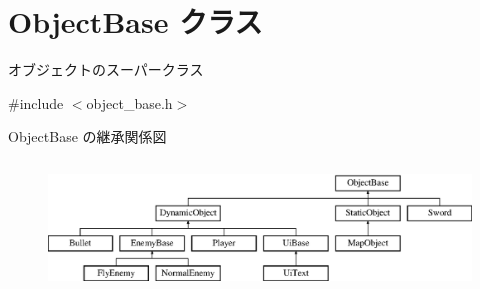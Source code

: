 \hypertarget{class_object_base}{}\section{Object\+Base クラス}
\label{class_object_base}


オブジェクトのスーパークラス  




{\ttfamily \#include $<$object\+\_\+base.\+h$>$}

Object\+Base の継承関係図\begin{figure}[H]
\begin{center}
\leavevmode
\includegraphics[height=3.522013cm]{class_object_base}
\end{center}
\end{figure}
